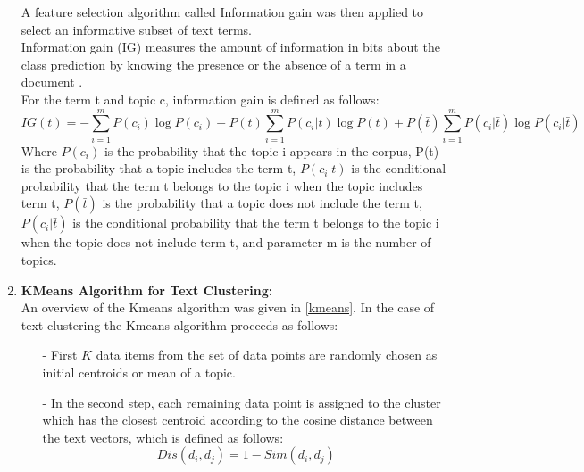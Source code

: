 \begin{enumerate}
A feature selection algorithm called Information gain was then applied to select an informative subset of text terms.\\ Information gain (IG) measures the amount of information in bits about the class prediction by knowing the presence or the absence of a term in a document \cite{a:yangcomp}.\\
  For the term t and topic c, information gain \cite{a:yangcomp} is defined as follows: \\
 \begin{equation}
IG(t)=-{\sum}_{i=1}^{m}P(c_{i})\log P(c_{i})+P(t){\sum}_{i=1}^{m}P(c_{i}\vert t)\log P(t)+P(\bar{t}){\sum}_{i=1}^{m}P(c_{i}\vert \bar{t})\log P(c_{i}\vert \bar{t})
\end{equation}
Where $P(c_{i})$ is the probability that the topic i appears in the corpus, P(t) is the probability that a topic includes the term t, $P(c_{i}\vert t)$ is the conditional probability that the term t belongs to the topic i when the topic includes term t, $P(\bar{t})$ is the probability that a topic does not include the term t, $P(c_{i}\vert \bar{t})$ is the conditional probability that the term t belongs to the topic i when the topic does not include term t, and parameter m is the number of topics.
		\item \textbf{KMeans Algorithm for Text Clustering:\\}
		An overview of the Kmeans algorithm was given in \ref{kmeans}. In the case of text clustering the Kmeans algorithm proceeds as follows: 
\begin{itemize}	
\item [-] First $K$ data items from the set of data points are randomly chosen as initial centroids or mean of a topic. 
\item [-] In the second step, each remaining data point is assigned to the cluster which has the closest centroid according to the cosine distance between the text vectors, which is defined as follows:
		\begin{equation}
			Dis(d_{i},d_{j})=1-Sim(d_{i},d_{j})
		\end{equation}
			

\end{itemize}
\end{enumerate}
